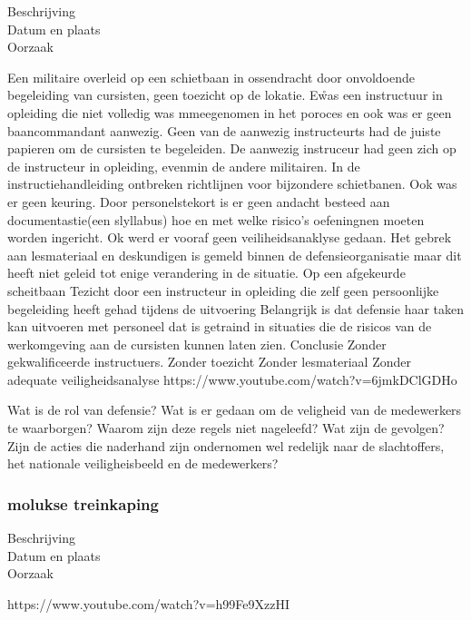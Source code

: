 \begin{description}
\item[Beschrijving]
\item[Datum en plaats] 
\item[Oorzaak]
\end{description}
Een militaire overleid op een schietbaan in ossendracht door onvoldoende begeleiding van cursisten, geen toezicht op de lokatie. E\r was een instructuur in opleiding die niet volledig was mmeegenomen in het poroces en ook was er geen baancommandant aanwezig. Geen van de aanwezig instructeurts had de juiste papieren om de cursisten te begeleiden. De aanwezig instruceur had geen zich op de instructeur in opleiding, evenmin de andere militairen. In de instructiehandleiding ontbreken richtlijnen voor bijzondere schietbanen. Ook was er geen keuring. Door personelstekort is er geen andacht besteed aan documentastie(een slyllabus) hoe en met welke risico’s oefeningnen moeten worden ingericht. Ok werd er vooraf geen veiliheidsanaklyse gedaan. Het gebrek aan lesmateriaal en deskundigen is gemeld binnen de defensieorganisatie maar dit heeft niet geleid tot enige verandering in de situatie.
Op een afgekeurde scheitbaan
Tezicht door een instructeur in opleiding die zelf geen persoonlijke begeleiding heeft gehad tijdens de uitvoering
Belangrijk is dat defensie haar taken kan uitvoeren met personeel dat is getraind in situaties die de risicos van de werkomgeving aan de cursisten kunnen laten zien.
Conclusie
Zonder gekwalificeerde instructuers.
Zonder toezicht
Zonder lesmateriaal
Zonder adequate veiligheidsanalyse
https://www.youtube.com/watch?v=6jmkDClGDHo 
\cite{oVVSchietongevalOssendrecht}
\cite{nos22032016ossendrecht}
\cite{ovv04042016lessenongevalossendrecht}
\cite{quekelboere10052017doodossendrecht}


Wat is de rol van defensie?
Wat is er gedaan om de veligheid van de medewerkers te waarborgen?
Waarom zijn deze regels niet nageleefd?
Wat zijn de gevolgen?
Zijn de acties die naderhand zijn ondernomen wel redelijk naar de slachtoffers, het nationale veiligheisbeeld en de medewerkers?



\subsubsection{molukse treinkaping }

\begin{description}
\item[Beschrijving]
\item[Datum en plaats] 
\item[Oorzaak]
\end{description}
https://www.youtube.com/watch?v=h99Fe9XzzHI 
\cite{molukseTreinkaping}
